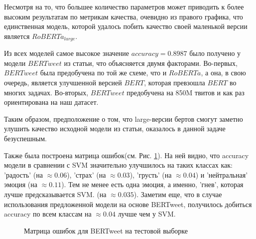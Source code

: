 \documentclass{article}
\begin{document}
Несмотря на то, что большее количество параметров может приводить к более высоким результатам по метрикам качества, очевидно из правого графика, что единственная модель, которой удалось побить качество своей маленькой версии является $RoBERTa_{large}$.

Из всех моделей самое высокое значение $accuracy = 0.8987$ было получено у модели $BERTweet$ из статьи, что объясняется двумя факторами. Во-первых, $BERTweet$ была предобучена по той же схеме, что и $RoBERTa$, а она, в свою очередь, является улучшенной версией $BERT$, которая превзошла $BERT$ во многих задачах. Во-вторых, $BERTweet$ предобучена на 850M твитов и как раз ориентирована на наш датасет.

Таким образом, предположение о том, что large-версии бертов смогут заметно улушить качество исходной модели из статьи, оказалось в данной задаче безуспешным.

Также была построена матрица ошибок(см. Рис. \ref{eq:conf_matr2}). На ней видно, что accuracy модели в сравнении с SVM значительно улучшилось на таких классах как: 'радость' (на $\approx\! 0.06$), 'страх' (на $\approx\! 0.03$), 'грусть' (на $\approx\! 0.04$) и 'нейтральная' эмоция (на $\approx\! 0.11$). Тем не менее есть одна эмоция, а именно, 'гнев', которая лучше предсказывается SVM. (на $\approx\! 0.035$). Заметим еще, что в случае использования предложенной модели на основе BERTweet, получилось добиться accuracy по всем классам на $\approx\! 0.04$ лучше чем у SVM.
\begin{figure}[h]
	
    \caption{\centering Матрица ошибок для BERTweet на тестовой выборке}
	\label{eq:conf_matr2}
\end{figure} 

\newpage


\end{document}
